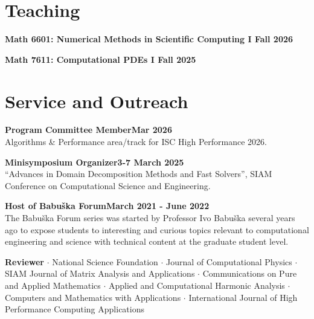 \documentclass[10pt,margin]{res}
\begin{document}
\begin{resume}
\vspace{-2em}

\pagebreak{}

\section{Teaching}

\textbf{Math 6601: Numerical Methods in Scientific Computing I \hfill{Fall 2026}}

\textbf{Math 7611: Computational PDEs I \hfill{Fall 2025}}




\section{Service and Outreach}

\textbf{Program Committee Member\hfill{Mar 2026}\\}
Algorithms \& Performance area/track for ISC High Performance 2026.

\textbf{Minisymposium Organizer\hfill{3-7 March 2025}\\}
``Advances in Domain Decomposition Methods and Fast Solvers'', SIAM Conference on Computational Science and Engineering.

\textbf{Host of Babu\v{s}ka Forum\hfill{March 2021 - June 2022}\\}
{The Babu\v{s}ka Forum series was started by Professor Ivo Babu\v{s}ka several years ago to expose students to interesting and curious topics relevant to computational engineering and science with technical content at the graduate student level.}

\textbf{Reviewer} $\cdot$ National Science Foundation $\cdot$ Journal of Computational Physics $\cdot$ SIAM Journal of Matrix Analysis and Applications $\cdot$ Communications on Pure and Applied Mathematics $\cdot$ Applied and Computational Harmonic Analysis $\cdot$ Computers and Mathematics with Applications $\cdot$ International Journal of High Performance Computing Applications 


\end{resume}
\end{document}
